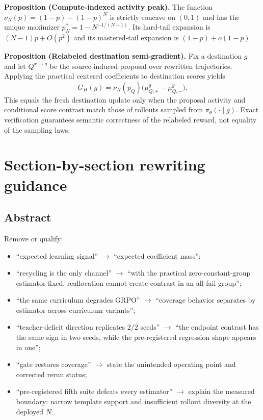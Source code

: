 \documentclass[11pt]{article}
\theoremstyle{definition}
\theoremstyle{remark}
\begin{document}
\begin{rewritebox}[title={\textbf{Proposition: peak}}]
\textbf{Proposition (Compute-indexed activity peak).} The function $\nu_N(p)=(1-p)-(1-p)^N$ is strictly concave on $(0,1)$ and has the unique maximizer $p_N^*=1-N^{-1/(N-1)}$. Its hard-tail expansion is $(N-1)p+O(p^2)$ and its mastered-tail expansion is $(1-p)+o(1-p)$.
\end{rewritebox}

\begin{rewritebox}[title={\textbf{Proposition: relabeled update}}]
\textbf{Proposition (Relabeled destination semi-gradient).} Fix a destination $g$ and let $Q^{x\to g}$ be the source-induced proposal over rewritten trajectories. Applying the practical centered coefficients to destination scores yields
\[
G_H(g)=\nu_N(p_Q)\bigl(\mu_{Q,+}^g-\mu_{Q,-}^g\bigr).
\]
This equals the fresh destination update only when the proposal activity and conditional score contrast match those of rollouts sampled from $\pi_\theta(\cdot\mid g)$. Exact verification guarantees semantic correctness of the relabeled reward, not equality of the sampling laws.
\end{rewritebox}

\section{Section-by-section rewriting guidance}

\subsection{Abstract}

Remove or qualify:

\begin{itemize}[leftmargin=2em]
\item ``expected learning signal'' $\rightarrow$ ``expected coefficient mass'';
\item ``recycling is the only channel'' $\rightarrow$ ``with the practical zero-constant-group estimator fixed, reallocation cannot create contrast in an all-fail group'';
\item ``the same curriculum degrades GRPO'' $\rightarrow$ ``coverage behavior separates by estimator across curriculum variants'';
\item ``teacher-deficit direction replicates 2/2 seeds'' $\rightarrow$ ``the endpoint contrast has the same sign in two seeds, while the pre-registered regression shape appears in one'';
\item ``gate restores coverage'' $\rightarrow$ state the unintended operating point and corrected rerun status;
\item ``pre-registered fifth suite defeats every estimator'' $\rightarrow$ explain the measured boundary: narrow template support and insufficient rollout diversity at the deployed $N$.
\end{itemize}
\end{document}
